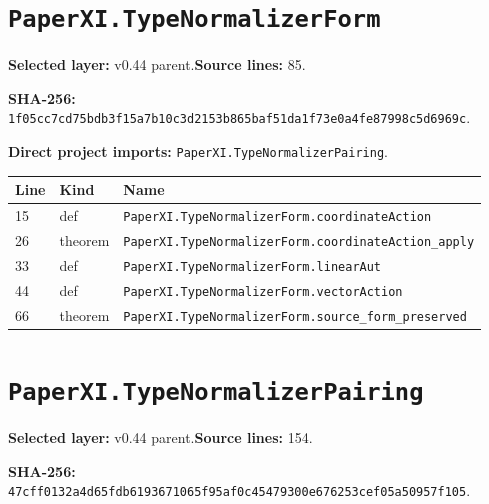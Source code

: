 \documentclass[10pt,oneside]{book}
\begin{document}
\section{\texorpdfstring{\nolinkurl{PaperXI.TypeNormalizerForm}}{PaperXI.TypeNormalizerForm}}\label{module:PaperXI.TypeNormalizerForm}

\textbf{Selected layer:} v0.44 parent.\quad\textbf{Source lines:} 85.\par\textbf{SHA-256:} {\scriptsize\nolinkurl{1f05cc7cd75bdb3f15a7b10c3d2153b865baf51da1f73e0a4fe87998c5d6969c}}.


\textbf{Direct project imports:} \nolinkurl{PaperXI.TypeNormalizerPairing}.

\begin{longtable}{@{}p{}p{}p{}@{}}\toprule Line&Kind&Name\\\midrule\endhead

15&def&\nolinkurl{PaperXI.TypeNormalizerForm.coordinateAction}\\

26&theorem&\nolinkurl{PaperXI.TypeNormalizerForm.coordinateAction_apply}\\

33&def&\nolinkurl{PaperXI.TypeNormalizerForm.linearAut}\\

44&def&\nolinkurl{PaperXI.TypeNormalizerForm.vectorAction}\\

66&theorem&\nolinkurl{PaperXI.TypeNormalizerForm.source_form_preserved}\\

\bottomrule\end{longtable}

\section{\texorpdfstring{\nolinkurl{PaperXI.TypeNormalizerPairing}}{PaperXI.TypeNormalizerPairing}}\label{module:PaperXI.TypeNormalizerPairing}

\textbf{Selected layer:} v0.44 parent.\quad\textbf{Source lines:} 154.\par\textbf{SHA-256:} {\scriptsize\nolinkurl{47cff0132a4d65fdb6193671065f95af0c45479300e676253cef05a50957f105}}.

\end{document}
